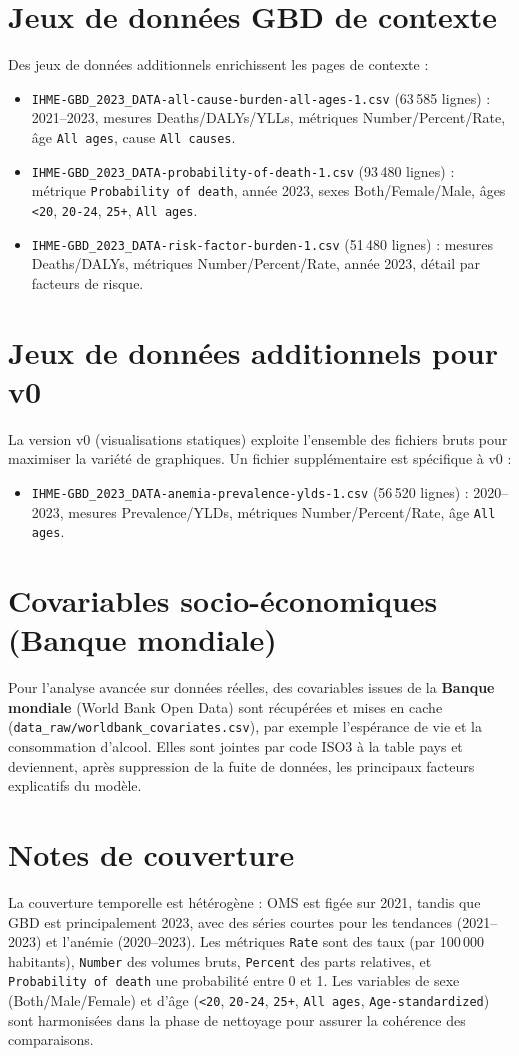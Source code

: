 \section{Jeux de données GBD de contexte}
Des jeux de données additionnels enrichissent les pages de contexte :
\begin{itemize}
    \item \texttt{IHME-GBD\_2023\_DATA-all-cause-burden-all-ages-1.csv} (63\,585 lignes) : 2021--2023, mesures Deaths/DALYs/YLLs, métriques Number/Percent/Rate, âge \texttt{All ages}, cause \texttt{All causes}.
    \item \texttt{IHME-GBD\_2023\_DATA-probability-of-death-1.csv} (93\,480 lignes) : métrique \texttt{Probability of death}, année 2023, sexes Both/Female/Male, âges \texttt{<20}, \texttt{20-24}, \texttt{25+}, \texttt{All ages}.
    \item \texttt{IHME-GBD\_2023\_DATA-risk-factor-burden-1.csv} (51\,480 lignes) : mesures Deaths/DALYs, métriques Number/Percent/Rate, année 2023, détail par facteurs de risque.
\end{itemize}

\section{Jeux de données additionnels pour v0}
La version v0 (visualisations statiques) exploite l'ensemble des fichiers bruts pour maximiser la variété de graphiques. Un fichier supplémentaire est spécifique à v0 :
\begin{itemize}
    \item \texttt{IHME-GBD\_2023\_DATA-anemia-prevalence-ylds-1.csv} (56\,520 lignes) : 2020--2023, mesures Prevalence/YLDs, métriques Number/Percent/Rate, âge \texttt{All ages}.
\end{itemize}

\section{Covariables socio-économiques (Banque mondiale)}
Pour l'analyse avancée sur données réelles, des covariables issues de la
\textbf{Banque mondiale} (World Bank Open Data) sont récupérées et mises en cache
(\texttt{data\_raw/worldbank\_covariates.csv}), par exemple l'espérance de vie et
la consommation d'alcool. Elles sont jointes par code ISO3 à la table pays et
deviennent, après suppression de la fuite de données, les principaux facteurs
explicatifs du modèle.

\section{Notes de couverture}
La couverture temporelle est hétérogène : OMS est figée sur 2021, tandis que GBD est principalement 2023, avec des séries courtes pour les tendances (2021--2023) et l'anémie (2020--2023). Les métriques \texttt{Rate} sont des taux (par 100\,000 habitants), \texttt{Number} des volumes bruts, \texttt{Percent} des parts relatives, et \texttt{Probability of death} une probabilité entre 0 et 1. Les variables de sexe (Both/Male/Female) et d'âge (\texttt{<20}, \texttt{20-24}, \texttt{25+}, \texttt{All ages}, \texttt{Age-standardized}) sont harmonisées dans la phase de nettoyage pour assurer la cohérence des comparaisons.
